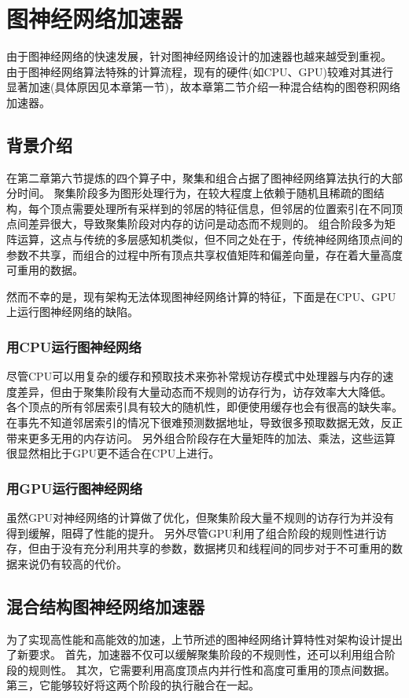 
\chapter{图神经网络加速器}
由于图神经网络的快速发展，针对图神经网络设计的加速器也越来越受到重视。
由于图神经网络算法特殊的计算流程，现有的硬件(如CPU、GPU)较难对其进行显著加速(具体原因见本章第一节)，故本章第二节介绍一种混合结构的图卷积网络加速器\cite{hygcn}。

\section{背景介绍}
在第二章第六节提炼的四个算子中，聚集和组合占据了图神经网络算法执行的大部分时间。
聚集阶段多为图形处理行为，在较大程度上依赖于随机且稀疏的图结构，每个顶点需要处理所有采样到的邻居的特征信息，但邻居的位置索引在不同顶点间差异很大，导致聚集阶段对内存的访问是动态而不规则的。
组合阶段多为矩阵运算，这点与传统的多层感知机类似，但不同之处在于，传统神经网络顶点间的参数不共享，而组合的过程中所有顶点共享权值矩阵和偏差向量，存在着大量高度可重用的数据。

然而不幸的是，现有架构无法体现图神经网络计算的特征，下面是在CPU、GPU上运行图神经网络的缺陷。

\subsection{用CPU运行图神经网络}
尽管CPU可以用复杂的缓存和预取技术来弥补常规访存模式中处理器与内存的速度差异，但由于聚集阶段有大量动态而不规则的访存行为，访存效率大大降低。
各个顶点的所有邻居索引具有较大的随机性，即便使用缓存也会有很高的缺失率。
在事先不知道邻居索引的情况下很难预测数据地址，导致很多预取数据无效，反正带来更多无用的内存访问。
另外组合阶段存在大量矩阵的加法、乘法，这些运算很显然相比于GPU更不适合在CPU上进行。

\subsection{用GPU运行图神经网络}
虽然GPU对神经网络的计算做了优化，但聚集阶段大量不规则的访存行为并没有得到缓解，阻碍了性能的提升。
另外尽管GPU利用了组合阶段的规则性进行访存，但由于没有充分利用共享的参数，数据拷贝和线程间的同步对于不可重用的数据来说仍有较高的代价。

\section{混合结构图神经网络加速器}
为了实现高性能和高能效的加速，上节所述的图神经网络计算特性对架构设计提出了新要求。
首先，加速器不仅可以缓解聚集阶段的不规则性，还可以利用组合阶段的规则性。 
其次，它需要利用高度顶点内并行性和高度可重用的顶点间数据。 
第三，它能够较好将这两个阶段的执行融合在一起。

